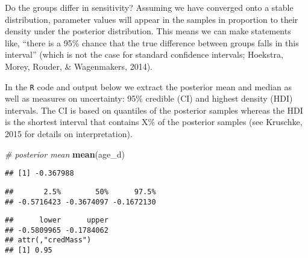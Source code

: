 \documentclass[
  english,
  ,man,floatsintext]{apa6}
\newenvironment{Shaded}{\begin{snugshade}}{\end{snugshade}}
\newcommand{\CommentTok}[1]{\textcolor[rgb]{0.56,0.35,0.01}{\textit{#1}}}
\newcommand{\DataTypeTok}[1]{\textcolor[rgb]{0.13,0.29,0.53}{#1}}
\newcommand{\FloatTok}[1]{\textcolor[rgb]{0.00,0.00,0.81}{#1}}
\newcommand{\KeywordTok}[1]{\textcolor[rgb]{0.13,0.29,0.53}{\textbf{#1}}}
\newcommand{\NormalTok}[1]{#1}
\begin{document}
Do the groups differ in sensitivity? Assuming we have converged onto a stable distribution, parameter values will appear in the samples in proportion to their density under the posterior distribution. This means we can make statements like, \enquote{there is a 95\% chance that the true difference between groups falls in this interval} (which is not the case for standard confidence intervals; Hoekstra, Morey, Rouder, \& Wagenmakers, 2014).

In the \texttt{R} code and output below we extract the posterior mean and median as well as measures on uncertainty: 95\% credible (CI) and highest density (HDI) intervals. The CI is based on quantiles of the posterior samples whereas the HDI is the shortest interval that contains X\% of the posterior samples (see Kruschke, 2015 for details on interpretation).

\begin{Shaded}
\begin{Highlighting}[]
\CommentTok{# posterior mean}
\KeywordTok{mean}\NormalTok{(age_d)}
\end{Highlighting}
\end{Shaded}

\begin{verbatim}
## [1] -0.367988
\end{verbatim}

\begin{Shaded}
\end{Shaded}

\begin{verbatim}
##       2.5%        50%      97.5% 
## -0.5716423 -0.3674097 -0.1672130
\end{verbatim}

\begin{Shaded}
\end{Shaded}

\begin{verbatim}
##      lower      upper 
## -0.5809965 -0.1784062 
## attr(,"credMass")
## [1] 0.95
\end{verbatim}
\end{document}
